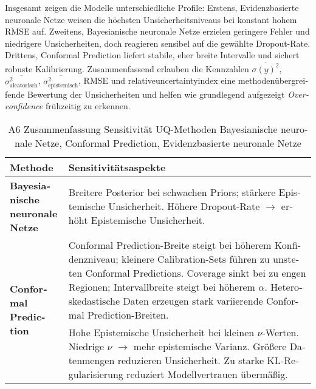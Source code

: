 \begin{otherlanguage}{ngerman}
Insgesamt zeigen die Modelle unterschiedliche Profile: Erstens, \gls{Evidenzbasierte neuronale Netze} weisen die höchsten Unsicherheitsniveaus bei konstant hohem RMSE auf. Zweitens, \gls{Bayesianische neuronale Netze} erzielen geringere Fehler und niedrigere Unsicherheiten, doch reagieren sensibel auf die gewählte Dropout-Rate. Drittens, \gls{Conformal Prediction} liefert stabile, eher breite Intervalle und sichert robuste Kalibrierung. Zusammenfassend erlauben die Kennzahlen \(\overline{\sigma(y)^2}\), \(\overline{\sigma_{\text{aleatorisch}}^2}\), \(\overline{\sigma_{\text{epistemisch}}^2}\), RMSE und \gls{relativeuncertaintyindex} eine methodenübergreifende Bewertung der Unsicherheiten und helfen wie grundlegend aufgezeigt \textit{Overconfidence} frühzeitig zu erkennen.



\begin{table}[!htbp]
\centering
\footnotesize
\begin{tabularx}{\textwidth}{|l|X|}
\hline
\textbf{Methode} & \hspace{0.0em}\textbf{Sensitivitätsaspekte} \\
\hline
\multirow{1}{*}{\textbf{\gls{Bayesianische neuronale Netze}}} &
Breitere Posterior bei schwachen Priors; stärkere \gls{Epistemische Unsicherheit}. Höhere Dropout-Rate \(\rightarrow\) erhöht \gls{Epistemische Unsicherheit}. \\
\hline
\multirow{2}{*}{\textbf{\gls{Conformal Prediction}}} &
\gls{Conformal Prediction}-Breite steigt bei höherem Konfidenzniveau; kleinere Calibration-Sets führen zu unsteten \gls{Conformal Prediction}s. Coverage sinkt bei zu engen Regionen; Intervallbreite steigt bei höherem \(\alpha\). Heteroskedastische Daten erzeugen stark variierende \gls{Conformal Prediction}-Breiten. \\
\hline
\multirow{2}{*}{\textbf{\gls{Evidenzbasierte neuronale Netze}}} &
Hohe \gls{Epistemische Unsicherheit} bei kleinen \(\nu\)-Werten. Niedrige \(\nu\) \(\rightarrow\) mehr epistemische Varianz. Größere Datenmengen reduzieren Unsicherheit. Zu starke KL-Regularisierung reduziert Modellvertrauen übermäßig. \\
\hline
\end{tabularx}
\caption{A6 Zusammenfassung Sensitivität UQ-Methoden \gls{Bayesianische neuronale Netze}, \gls{Conformal Prediction}, \gls{Evidenzbasierte neuronale Netze}}
\label{tab:sensitivity_r9_transposed}
\end{table}




\end{otherlanguage}
